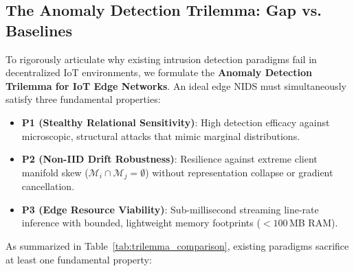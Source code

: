 \subsection{The Anomaly Detection Trilemma: Gap vs. Baselines}
\label{subsec:trilemma}

To rigorously articulate why existing intrusion detection paradigms fail in decentralized IoT environments, we formulate the \textbf{Anomaly Detection Trilemma for IoT Edge Networks}. An ideal edge NIDS must simultaneously satisfy three fundamental properties:
\begin{itemize}
    \item \textbf{P1 (Stealthy Relational Sensitivity)}: High detection efficacy against microscopic, structural attacks that mimic marginal distributions.
    \item \textbf{P2 (Non-IID Drift Robustness)}: Resilience against extreme client manifold skew ($\mathcal{M}_i \cap \mathcal{M}_j = \emptyset$) without representation collapse or gradient cancellation.
    \item \textbf{P3 (Edge Resource Viability)}: Sub-millisecond streaming line-rate inference with bounded, lightweight memory footprints ($<100$\,MB RAM).
\end{itemize}

As summarized in Table~\ref{tab:trilemma_comparison}, existing paradigms sacrifice at least one fundamental property:

